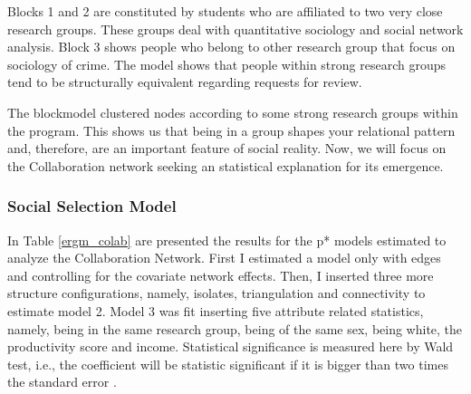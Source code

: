 \documentclass[12pt, english]{article}
\begin{document}
Blocks 1 and 2 are constituted by students who are affiliated to two very close research groups. These groups deal with quantitative sociology and social network analysis. Block 3 shows people who belong to other research group that focus on sociology of crime. The model shows that people within strong research groups tend to be structurally equivalent regarding requests for review.

The blockmodel clustered nodes according to some strong research groups within the program. This shows us that being in a group shapes your relational pattern and, therefore, are an important feature of social reality. Now, we will focus on the Collaboration network seeking an statistical explanation for its emergence.

\subsubsection{Social Selection Model}

In Table \ref{ergm_colab} are presented the results for the p* models estimated to analyze the Collaboration Network. First I estimated a model only with edges and controlling for the covariate network effects. Then, I inserted three more structure configurations, namely, isolates, triangulation and connectivity to estimate model 2. Model 3 was fit inserting five attribute related statistics, namely, being in the same research group, being of the same sex, being white, the productivity score and income. Statistical significance is measured here by Wald test, i.e., the coefficient will be statistic significant if it is bigger than two times the standard error \cite{lusher2013exponential,lazega2014redes}.
\end{document}
